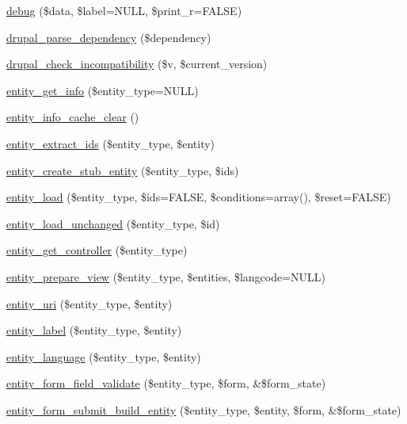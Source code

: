 \begin{DoxyCompactItemize}
\hyperlink{common_8inc_a008ec6c4681fcb83701755c61daa8050}{debug} (\$data, \$label=NULL, \$print\_\-r=FALSE)
\item 
\hyperlink{common_8inc_a4e06efa27b45d3aa8670a8553d0194d6}{drupal\_\-parse\_\-dependency} (\$dependency)
\item 
\hyperlink{common_8inc_aa2a2d57500dc465711da5ac8e6afd406}{drupal\_\-check\_\-incompatibility} (\$v, \$current\_\-version)
\item 
\hyperlink{common_8inc_a202e2a1b69e813ef9c48464efeca8ed3}{entity\_\-get\_\-info} (\$entity\_\-type=NULL)
\item 
\hyperlink{common_8inc_a1905abb5de031d0030e680de4634fc66}{entity\_\-info\_\-cache\_\-clear} ()
\item 
\hyperlink{common_8inc_ae8d0c984add0f9ff53a2a6dc4fb1ba58}{entity\_\-extract\_\-ids} (\$entity\_\-type, \$entity)
\item 
\hyperlink{common_8inc_af0b338fb292ad46545a3d35178a0155b}{entity\_\-create\_\-stub\_\-entity} (\$entity\_\-type, \$ids)
\item 
\hyperlink{common_8inc_a78b89cf93f9710a68d02f86adccf1898}{entity\_\-load} (\$entity\_\-type, \$ids=FALSE, \$conditions=array(), \$reset=FALSE)
\item 
\hyperlink{common_8inc_ad6d77695e6a66026389a4a734202b253}{entity\_\-load\_\-unchanged} (\$entity\_\-type, \$id)
\item 
\hyperlink{common_8inc_ae99d85c4f3144d7211e312e293c3be70}{entity\_\-get\_\-controller} (\$entity\_\-type)
\item 
\hyperlink{common_8inc_a180628d308e46de0a76e7cdc0e65ce4d}{entity\_\-prepare\_\-view} (\$entity\_\-type, \$entities, \$langcode=NULL)
\item 
\hyperlink{common_8inc_a00f3b77a23f66be91c30ae42d8ea40cd}{entity\_\-uri} (\$entity\_\-type, \$entity)
\item 
\hyperlink{common_8inc_aa9868513964b440f8206571573b833b3}{entity\_\-label} (\$entity\_\-type, \$entity)
\item 
\hyperlink{common_8inc_abd1bd4466071377d474040174c49f06b}{entity\_\-language} (\$entity\_\-type, \$entity)
\item 
\hyperlink{common_8inc_a730911cdea4f78ea5c6995afdbd266f9}{entity\_\-form\_\-field\_\-validate} (\$entity\_\-type, \$form, \&\$form\_\-state)
\item 
\hyperlink{common_8inc_a0aac8c55307d5f8bca09e44481bcfc9a}{entity\_\-form\_\-submit\_\-build\_\-entity} (\$entity\_\-type, \$entity, \$form, \&\$form\_\-state)
\item 

\end{DoxyCompactItemize}
